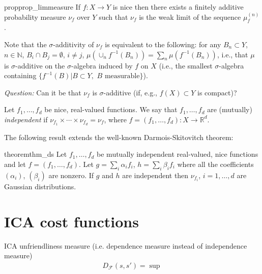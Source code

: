 \documentclass[12pt]{article}
\newcommand{\todoc}[2][]{\todo[color=Apricot,#1]{#2}}
\newcommand{\ra}{\rightarrow}
\newcommand{\real}{\mathbb{R}}
\renewcommand{\natural}{\mathbb{N}}
\begin{document}
\begin{restatable}{prop}{prop_limmeasure}
If $f:X\ra Y$ is nice then there exists a finitely additive probability measure $\nu_f$ over $Y$ such that $\nu_f$ is the weak limit of the sequence $\mu^{(n)}_f$.
\end{restatable}

Note that the $\sigma$-additivity of $\nu_f$ is equivalent to the following: for any $B_n\subset Y$, $n\in \natural$, $B_i \cap B_j = \emptyset$, $i\ne j$, $\mu(\cup_n f^{-1}(B_n) ) = \sum_n \mu(f^{-1}(B_n))$, i.e., that $\mu$ is $\sigma$-additive on the $\sigma$-algebra induced by $f$ on $X$ (i.e., the smallest $\sigma$-algebra containing $\{f^{-1}(B)| B \subset Y, \,\, B \text{ measurable}\}$).

\emph{Question:} Can it be that $\nu_f$ is $\sigma$-additive (if, e.g., $f(X)\subset Y$ is compact)?


Let $f_1,\ldots, f_d$ be nice, real-valued functions.
We say that $f_1,\ldots, f_d$ are (mutually) \emph{independent}
 if $\nu_{f_1} \times \cdots \times \nu_{f_d} = \nu_f$, where $f = (f_1,\ldots, f_d):X\ra \real^d$.

The following result extends the well-known Darmois-Skitovitch theorem:
\begin{restatable}{theorem}{thm_ds}
Let $f_1,\ldots,f_d$ be mutually independent real-valued, nice functions and let $f = (f_1,\ldots,f_d)$.
Let $g = \sum_i \alpha_i f_i$, $h = \sum_i \beta_i f_i$ where all the coefficients $(\alpha_i)$, $(\beta_i)$ are nonzero.
If $g$ and $h$ are independent then $\nu_{f_i}$, $i=1,\ldots,d$ are Gaussian distributions.
\end{restatable}


\section{ICA cost functions}
ICA unfriendliness measure (i.e. dependence measure instead of independence measure)
\begin{eqnarray*}
D_{\mathcal{F}}(s,s')=\sup
\end{eqnarray*}
\end{document}
